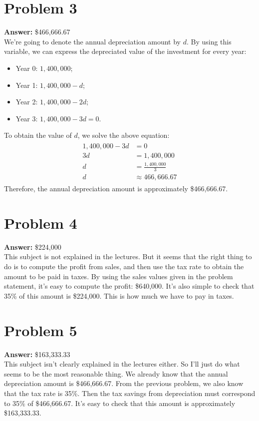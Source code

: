 \documentclass[11pt]{article}
\begin{document}
\section*{Problem 3}
\label{sec:orgbc779f7}

\textbf{Answer:} \$466,666.67\\

We're going to denote the annual depreciation amount by \(d\). By using this
variable, we can express the depreciated value of the investment for every year:
\begin{itemize}
\item Year 0: \(1,400,000\);
\item Year 1: \(1,400,000-d\);
\item Year 2: \(1,400,000-2d\);
\item Year 3: \(1,400,000-3d=0\).
\end{itemize}
To obtain the value of \(d\), we solve the above equation:
\begin{align}
  \begin{split}
    1,400,000-3d&=0\\
    3d&=1,400,000\\
    d&=\frac{1,400,000}{3}\\
    d&\approx 466,666.67
  \end{split}
\end{align}
Therefore, the annual depreciation amount is approximately \$466,666.67.
\section*{Problem 4}
\label{sec:org4db0539}

\textbf{Answer:} \$224,000\\

This subject is not explained in the lectures. But it seems that the right thing
to do is to compute the profit from sales, and then use the tax rate to obtain
the amount to be paid in taxes.
By using the sales values given in the problem statement, it's easy to compute
the profit: \$640,000. It's also simple to check that 35\% of this amount is
\$224,000. This is how much we have to pay in taxes.
\section*{Problem 5}
\label{sec:org133f36c}

\textbf{Answer:} \$163,333.33\\

This subject isn't clearly explained in the lectures either. So I'll just do
what seems to be the most reasonable thing. We already know that the annual
depreciation amount is \$466,666.67. From the previous problem, we also know that
the tax rate is 35\%. Then the tax savings from depreciation must correspond to
35\% of \$466,666.67.
It's easy to check that this amount is approximately \$163,333.33.
\end{document}
